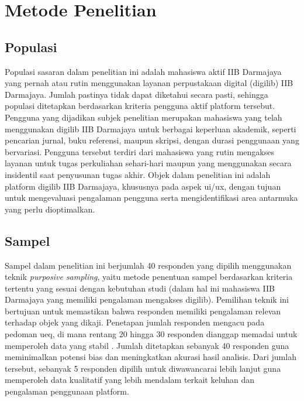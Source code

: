 \chapter{Metode Penelitian}\label{cha:method}

\section{Populasi}
Populasi sasaran dalam penelitian ini adalah mahasiswa aktif IIB Darmajaya yang pernah atau rutin menggunakan layanan perpustakaan digital (\gls{digilib}) IIB Darmajaya. Jumlah pastinya tidak dapat diketahui secara pasti, sehingga populasi ditetapkan berdasarkan kriteria pengguna aktif platform tersebut. Pengguna yang dijadikan subjek penelitian merupakan mahasiswa yang telah menggunakan \gls{digilib} IIB Darmajaya untuk berbagai keperluan akademik, seperti pencarian jurnal, buku referensi, maupun skripsi, dengan durasi penggunaan yang bervariasi. Pengguna tersebut terdiri dari mahasiswa yang rutin mengakses layanan untuk tugas perkuliahan sehari-hari maupun yang menggunakan secara insidentil saat penyusunan tugas akhir. Objek dalam penelitian ini adalah platform \gls{digilib} IIB Darmajaya, khususnya pada aspek \gls{ui}/\gls{ux}, dengan tujuan untuk mengevaluasi pengalaman pengguna serta mengidentifikasi area antarmuka yang perlu dioptimalkan.

\section{Sampel}
Sampel dalam penelitian ini berjumlah 40 responden yang dipilih menggunakan teknik \textit{purposive sampling}, yaitu metode penentuan sampel berdasarkan kriteria tertentu yang sesuai dengan kebutuhan studi (dalam hal ini mahasiswa IIB Darmajaya yang memiliki pengalaman mengakses \gls{digilib}). Pemilihan teknik ini bertujuan untuk memastikan bahwa responden memiliki pengalaman relevan terhadap objek yang dikaji. Penetapan jumlah responden mengacu pada pedoman \gls{ueq}, di mana rentang 20 hingga 30 responden dianggap memadai untuk memperoleh data yang stabil \cite{schrepp2014applying}. Jumlah ditetapkan sebanyak 40 responden guna meminimalkan potensi bias dan meningkatkan akurasi hasil analisis. Dari jumlah tersebut, sebanyak 5 responden dipilih untuk diwawancarai lebih lanjut guna memperoleh data kualitatif yang lebih mendalam terkait keluhan dan pengalaman penggunaan platform.

